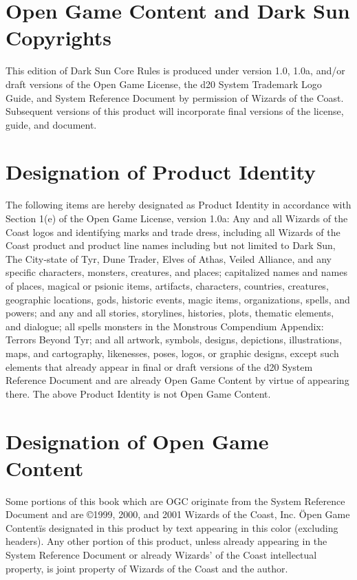 \documentclass{report}
\begin{document}
\section*{Open Game Content and Dark Sun Copyrights}
This edition of Dark Sun Core Rules is produced under version 1.0, 1.0a, and/or draft versions of the Open Game License, the d20 System Trademark Logo Guide, and System Reference Document by permission of Wizards of the Coast. Subsequent versions of this product will incorporate final versions of the license, guide, and document.

\section*{Designation of Product Identity}
The following items are hereby designated as Product Identity in accordance with Section 1(e) of the Open Game License, version 1.0a: Any and all Wizards of the Coast logos and identifying marks and trade dress, including all Wizards of the Coast product and product line names including but not limited to Dark Sun, The City‐state of Tyr, Dune Trader, Elves of Athas, Veiled Alliance, and any specific characters, monsters, creatures, and places; capitalized names and names of places, magical or psionic items, artifacts, characters, countries, creatures, geographic locations, gods, historic events, magic items, organizations, spells, and powers; and any and all stories, storylines, histories, plots, thematic elements, and dialogue; all spells monsters in the Monstrous Compendium Appendix: Terrors Beyond Tyr; and all artwork, symbols, designs, depictions, illustrations, maps, and cartography, likenesses, poses, logos, or graphic designs, except such elements that already appear in final or draft versions of the d20 System Reference Document and are already Open Game Content by virtue of appearing there. The above Product Identity is not Open Game Content.

\section*{Designation of Open Game Content}
Some portions of this book which are OGC originate from the System Reference Document and are ©1999, 2000, and 2001 Wizards of the Coast, Inc. \"Open Game Content\" is designated in this product by text appearing in this color (excluding headers). Any other portion of this product, unless already appearing in the System Reference Document or already Wizards' of the Coast intellectual property, is joint property of Wizards of the Coast and the author.
\end{document}
